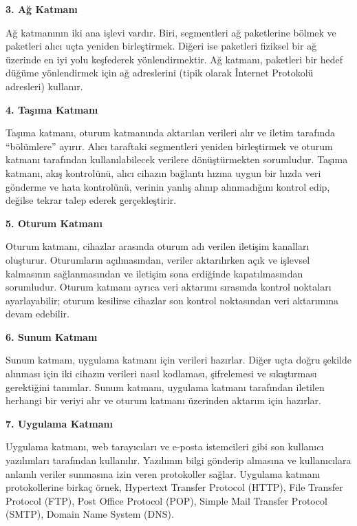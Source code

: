 \vspace{10mm}
\textbf{3. Ağ Katmanı}
\vspace{5mm}

Ağ katmanının iki ana işlevi vardır. Biri, segmentleri ağ paketlerine bölmek ve paketleri alıcı uçta yeniden birleştirmek. Diğeri ise paketleri fiziksel bir ağ üzerinde en iyi yolu keşfederek yönlendirmektir. Ağ katmanı, paketleri bir hedef düğüme yönlendirmek için ağ adreslerini (tipik olarak İnternet Protokolü adresleri) kullanır.

\vspace{10mm}
\textbf{4. Taşıma Katmanı}
\vspace{5mm}

Taşıma katmanı, oturum katmanında aktarılan verileri alır ve iletim tarafında “bölümlere” ayırır. Alıcı taraftaki segmentleri yeniden birleştirmek ve oturum katmanı tarafından kullanılabilecek verilere dönüştürmekten sorumludur. Taşıma katmanı, akış kontrolünü, alıcı cihazın bağlantı hızına uygun bir hızda veri gönderme ve hata kontrolünü, verinin yanlış alınıp alınmadığını kontrol edip, değilse tekrar talep ederek gerçekleştirir.

\vspace{10mm}
\textbf{5. Oturum Katmanı}
\vspace{5mm}

Oturum katmanı, cihazlar arasında oturum adı verilen iletişim kanalları oluşturur. Oturumların açılmasından, veriler aktarılırken açık ve işlevsel kalmasının sağlanmasından ve iletişim sona erdiğinde kapatılmasından sorumludur. Oturum katmanı ayrıca veri aktarımı sırasında kontrol noktaları ayarlayabilir; oturum kesilirse cihazlar son kontrol noktasından veri aktarımına devam edebilir.

\vspace{10mm}
\textbf{6. Sunum Katmanı}
\vspace{5mm}

Sunum katmanı, uygulama katmanı için verileri hazırlar. Diğer uçta doğru şekilde alınması için iki cihazın verileri nasıl kodlaması, şifrelemesi ve sıkıştırması gerektiğini tanımlar. Sunum katmanı, uygulama katmanı tarafından iletilen herhangi bir veriyi alır ve oturum katmanı üzerinden aktarım için hazırlar.

\vspace{10mm}
\textbf{7. Uygulama Katmanı}
\vspace{5mm}

Uygulama katmanı, web tarayıcıları ve e-posta istemcileri gibi son kullanıcı yazılımları tarafından kullanılır. Yazılımın bilgi gönderip almasına ve kullanıcılara anlamlı veriler sunmasına izin veren protokoller sağlar. Uygulama katmanı protokollerine birkaç örnek, Hypertext Transfer Protocol (HTTP), File Transfer Protocol (FTP), Post Office Protocol (POP), Simple Mail Transfer Protocol (SMTP), Domain Name System (DNS).

